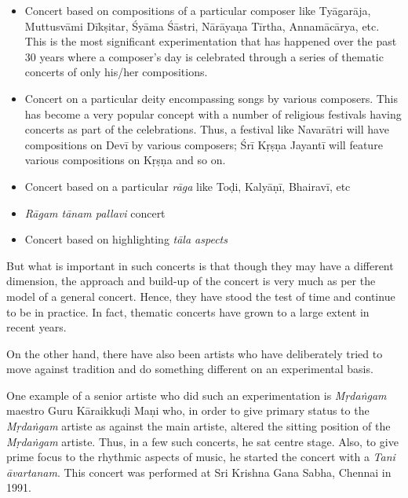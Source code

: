 \begin{itemize}
\itemsep=0pt

 \item Concert based on compositions of a particular composer like Tyāgarāja, Muttusvāmi Dīkṣitar, Śyāma Śāstri, Nārāyaṇa Tīrtha, Annamācārya, etc. This is the most significant experimentation that has happened over the past 30 years where a composer’s day is celebrated through a series of thematic concerts of only his/her compositions.

 \item Concert on a particular deity encompassing songs by various composers. This has become a very popular concept with a number of religious festivals having concerts as part of the celebrations. Thus, a festival like Navarātri will have compositions on Devī by various composers; Śrī Kṛṣṇa Jayantī will feature various compositions on Kṛṣṇa and so on.

 \item Concert based on a particular \textit{rāga} like Toḍi, Kalyāṇī, Bhairavī, etc

 \item \textit{Rāgam tānam pallavi} concert

 \item Concert based on highlighting \textit{tāla aspects}

\end{itemize}

But what is important in such concerts is that though they may have a different dimension, the approach and build-up of the concert is very much as per the model of a general concert. Hence, they have stood the test of time and continue to be in practice. In fact, thematic concerts have grown to a large extent in recent years.

On the other hand, there have also been artists who have deliberately tried to move against tradition and do something different on an experimental basis.

One example of a senior artiste who did such an experimentation is \textit{Mṛdaṅgam} maestro Guru Kāraikkuḍi Maṇi who, in order to give primary status to the \textit{Mṛdaṅgam} artiste as against the main artiste, altered the sitting position of the \textit{Mṛdaṅgam} artiste. Thus, in a few such concerts, he sat centre stage. Also, to give prime focus to the rhythmic aspects of music, he started the concert with a \textit{Tani āvartanam}.   This concert was performed at Sri Krishna Gana Sabha, Chennai in 1991.

